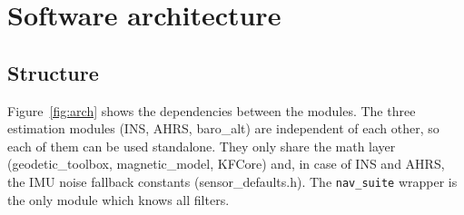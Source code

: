 \documentclass[11pt,a4paper]{article}
\newcommand{\code}[1]{\texttt{#1}}
\begin{document}
\section{Software architecture}

\subsection{Structure}

Figure~\ref{fig:arch} shows the dependencies between the modules. The three
estimation modules (INS, AHRS, baro\_alt) are independent of each other, so each
of them can be used standalone. They only share the math layer
(geodetic\_toolbox, magnetic\_model, KFCore) and, in case of INS and AHRS, the
IMU noise fallback constants (sensor\_defaults.h). The
\code{nav\_\allowbreak{}suite} wrapper is the only module which knows all
filters.
\end{document}
